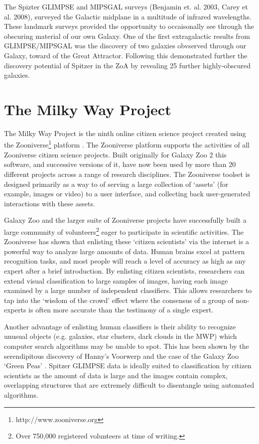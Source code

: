 \documentclass[times,usenatbib]{mn2e}
\begin{document}
The Spizter GLIMPSE and MIPSGAL surveys (Benjamin et. al. 2003, Carey et al. 2008), surveyed the Galactic midplane in a multitude of infrared wavelengths. These landmark surveys provided the opportunity to occaisonally see through the obscuring material of our own Galaxy. One of the first extragalactic results from GLIMPSE/MIPSGAL was the \citet{Jarrett+07} discovery of two galaxies obvserved through our Galaxy, toward of the Great Attractor. Following this \citet{Marleau+08} demonstrated further the discovery potential of Spitzer in the ZoA by revealing 25 further highly-obscured galaxies.

\section{The Milky Way Project}
\label{mwp-desc}

The Milky Way Project \citep[MWP,][]{Simpson+12} is the ninth online citizen science project created using the Zooniverse\footnote{http://www.zooniverse.org} platform \citep{2011MNRAS.412.1309S}. The Zooniverse platform supports the activities of all Zooniverse citizen science projects. Built originally for Galaxy Zoo 2 this software, and successive versions of it, have now been used by more than 20 different projects across a range of research disciplines. The Zooniverse toolset is designed primarily as a way to of serving a large collection of `assets' (for example, images or video) to a user interface, and collecting back user-generated interactions with these assets.

Galaxy Zoo \citep{Lintott+08, Lintott+11} and the larger suite of Zooniverse projects have successfully built a large community of volunteers\footnote{Over 750,000 registered volunteers at time of writing.} eager to participate in scientific activities. The Zooniverse has shown that enlisting these `citizen scientists' via the internet is a powerful way to analyze large amounts of data. Human brains excel at pattern recognition tasks, and most people will reach a level of accuracy as high as any expert after a brief introduction. By enlisting citizen scientists, researchers can extend visual classification to large samples of images, having each image examined by a large number of independent classifiers. This allows researchers to tap into the `wisdom of the crowd' effect where the consensus of a group of non-experts is often more accurate than the testimony of a single expert.

Another advantage of enlisting human classifiers is their ability to recognize unusual objects (e.g. galaxies, star clusters, dark clouds in the MWP) which computer search algorithms  may be unable to spot. This has been shown by the serendipitous discovery of Hanny's Voorwerp \citep{2009MNRAS.399..129L} and the case of the Galaxy Zoo `Green Peas' \citep{2009MNRAS.399.1191C}. Spitzer GLIMPSE data is ideally suited to classification by citizen scientists as the amount of data is large and the images contain complex, overlapping structures that are extremely difficult to disentangle using automated algorithms.
\end{document}
